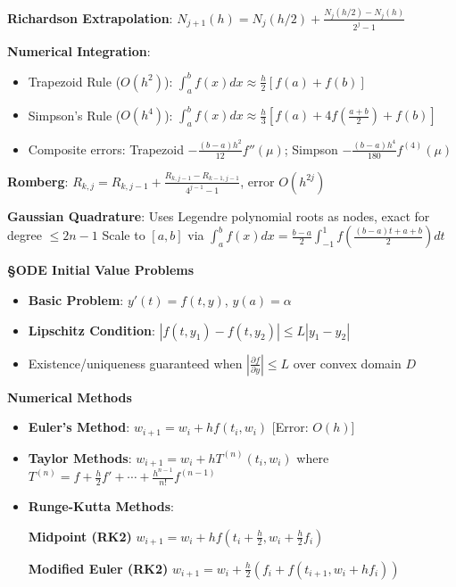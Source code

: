 \documentclass{article}
\begin{document}
\begin{minipage}[t]{0.49\textwidth}
\textbf{Richardson Extrapolation}: $N_{j+1}(h) = N_j(h/2) + \frac{N_j(h/2) - N_j(h)}{2^{j}-1}$

\textbf{Numerical Integration}:
\begin{itemize}\setlength{\itemsep}{-1pt}
\item Trapezoid Rule ($O(h^2)$): $\int_a^b f(x)dx \approx \frac{h}{2}[f(a) + f(b)]$
\item Simpson's Rule ($O(h^4)$): $\int_a^b f(x)dx \approx \frac{h}{3}[f(a) + 4f\left(\frac{a+b}{2}\right) + f(b)]$
\item Composite errors: Trapezoid $-\frac{(b-a)h^2}{12}f''(\mu)$; Simpson $-\frac{(b-a)h^4}{180}f^{(4)}(\mu)$
\end{itemize}

\textbf{Romberg}: $R_{k,j} = R_{k,j-1} + \frac{R_{k,j-1} - R_{k-1,j-1}}{4^{j-1}-1}$, error $O(h^{2j})$

\textbf{Gaussian Quadrature}: Uses Legendre polynomial roots as nodes, exact for degree $\leq 2n-1$
Scale to $[a,b]$ via $\int_a^b f(x)dx = \frac{b-a}{2}\int_{-1}^1 f\left(\frac{(b-a)t + a + b}{2}\right)dt$

\textbf{\S ODE Initial Value Problems}
\begin{itemize}
\item \textbf{Basic Problem}: $y'(t) = f(t,y)$, $y(a) = \alpha$
\item \textbf{Lipschitz Condition}: $|f(t,y_1) - f(t,y_2)| \leq L|y_1 - y_2|$ 
\item Existence/uniqueness guaranteed when $|\frac{\partial f}{\partial y}| \leq L$ over convex domain $D$
\end{itemize}

\textbf{Numerical Methods}
\begin{itemize}
\item \textbf{Euler's Method}: $w_{i+1} = w_i + hf(t_i,w_i)$ [Error: $O(h)$]
\item \textbf{Taylor Methods}: $w_{i+1} = w_i + hT^{(n)}(t_i,w_i)$ where 
$T^{(n)} = f + \frac{h}{2}f' + \cdots + \frac{h^{n-1}}{n!}f^{(n-1)}$
\item \textbf{Runge-Kutta Methods}:
\begin{minipage}[t]{0.45\textwidth}
    \textbf{Midpoint (RK2)}
    $w_{i+1} = w_i + hf(t_i+\frac{h}{2}, w_i+\frac{h}{2}f_i)$
\end{minipage}
\hfill
\begin{minipage}[t]{0.45\textwidth}
    \textbf{Modified Euler (RK2)}
    $w_{i+1} = w_i + \frac{h}{2}(f_i + f(t_{i+1},w_i+hf_i))$
\end{minipage}


\end{itemize}
\end{minipage}
\end{document}

